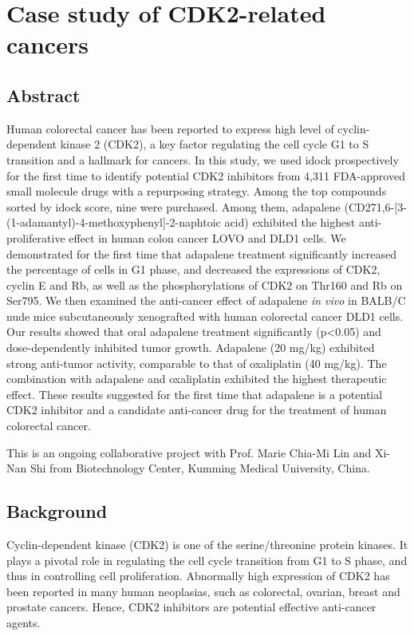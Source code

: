 \chapter{Case study of CDK2-related cancers}
\label{cdk2}

\section{Abstract}

Human colorectal cancer has been reported to express high level of cyclin-dependent kinase 2 (CDK2), a key factor regulating the cell cycle G1 to S transition and a hallmark for cancers. In this study, we used idock prospectively for the first time to identify potential CDK2 inhibitors from 4,311 FDA-approved small molecule drugs with a repurposing strategy. Among the top compounds sorted by idock score, nine were purchased. Among them, adapalene (CD271,6-[3-(1-adamantyl)-4-methoxyphenyl]-2-naphtoic acid) exhibited the highest anti-proliferative effect in human colon cancer LOVO and DLD1 cells. We demonstrated for the first time that adapalene treatment significantly increased the percentage of cells in G1 phase, and decreased the expressions of CDK2, cyclin E and Rb, as well as the phosphorylations of CDK2 on Thr160 and Rb on Ser795. We then examined the anti-cancer effect of adapalene \textit{in vivo} in BALB/C nude mice subcutaneously xenografted with human colorectal cancer DLD1 cells. Our results showed that oral adapalene treatment significantly (p<0.05) and dose-dependently inhibited tumor growth. Adapalene (20 mg/kg) exhibited strong anti-tumor activity, comparable to that of oxaliplatin (40 mg/kg). The combination with adapalene and oxaliplatin exhibited the highest therapeutic effect. These results suggested for the first time that adapalene is a potential CDK2 inhibitor and a candidate anti-cancer drug for the treatment of human colorectal cancer.

This is an ongoing collaborative project with Prof. Marie Chia-Mi Lin and Xi-Nan Shi from Biotechnology Center, Kumming Medical University, China.

\section{Background}

Cyclin-dependent kinase (CDK2) is one of the serine/threonine protein kinases. It plays a pivotal role in regulating the cell cycle transition from G1 to S phase, and thus in controlling cell proliferation. Abnormally high expression of CDK2 has been reported in many human neoplasias, such as colorectal, ovarian, breast and prostate cancers. Hence, CDK2 inhibitors are potential effective anti-cancer agents.

